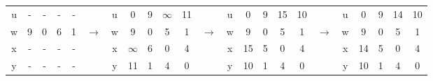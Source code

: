\documentclass{article}
\begin{document}
\begin{latin}
\begin{table}[H]
\begin{tabular}{ccccccccccccccccccccccc}
\multicolumn{1}{|c|}{u}            & -                      & -                      & -                      & -                      & \multicolumn{1}{c|}{}                  & \multicolumn{1}{c|}{u}            & 0                      & 9                      & $\infty$               & 11                     & \multicolumn{1}{c|}{}                  & \multicolumn{1}{c|}{u}            & 0                      & 9                      & 15                     & 10                     & \multicolumn{1}{c|}{}                  & \multicolumn{1}{c|}{u}            & 0                      & 9                      & 14                     & 10                     \\ \cline{1-1} \cline{7-7} \cline{13-13} \cline{19-19}
\multicolumn{1}{|c|}{w}            & 9                      & 0                      & 6                      & 1                      & \multicolumn{1}{c|}{$\longrightarrow$} & \multicolumn{1}{c|}{w}            & 9                      & 0                      & 5                      & 1                      & \multicolumn{1}{c|}{$\longrightarrow$} & \multicolumn{1}{c|}{w}            & 9                      & 0                      & 5                      & 1                      & \multicolumn{1}{c|}{$\longrightarrow$} & \multicolumn{1}{c|}{w}            & 9                      & 0                      & 5                      & 1                      \\ \cline{1-1} \cline{7-7} \cline{13-13} \cline{19-19}
\multicolumn{1}{|c|}{x}            & -                      & -                      & -                      & -                      & \multicolumn{1}{c|}{}                  & \multicolumn{1}{c|}{x}            & $\infty$               & 6                      & 0                      & 4                      & \multicolumn{1}{c|}{}                  & \multicolumn{1}{c|}{x}            & 15                     & 5                      & 0                      & 4                      & \multicolumn{1}{c|}{}                  & \multicolumn{1}{c|}{x}            & 14                     & 5                      & 0                      & 4                      \\ \cline{1-1} \cline{7-7} \cline{13-13} \cline{19-19}
\multicolumn{1}{|c|}{y}            & -                      & -                      & -                      & -                      & \multicolumn{1}{c|}{}                  & \multicolumn{1}{c|}{y}            & 11                     & 1                      & 4                      & 0                      & \multicolumn{1}{c|}{}                  & \multicolumn{1}{c|}{y}            & 10                     & 1                      & 4                      & 0                      & \multicolumn{1}{c|}{}                  & \multicolumn{1}{c|}{y}            & 10                     & 1                      & 4                      & 0                      \\ \cline{1-1} \cline{7-7} \cline{13-13} \cline{19-19}

\end{tabular}
\end{table}
\end{latin}
\end{document}
